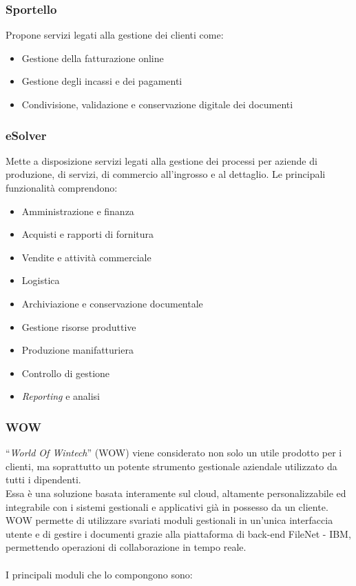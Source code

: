 \subsubsection*{Sportello}
Propone servizi legati alla gestione dei clienti come:  
\begin{itemize}
    \item Gestione della fatturazione online 
    \item Gestione degli incassi e dei pagamenti 
    \item Condivisione, validazione e conservazione digitale dei documenti  
\end{itemize}

\subsubsection*{eSolver}
Mette a disposizione servizi legati alla gestione dei processi per aziende di produzione, di servizi, di commercio all'ingrosso e al dettaglio. 
Le principali funzionalità comprendono: 
\begin{itemize}
    \item Amministrazione e finanza 
    \item Acquisti e rapporti di fornitura 
    \item Vendite e attività commerciale 
    \item Logistica
    \item Archiviazione e conservazione documentale
    \item Gestione risorse produttive 
    \item Produzione manifatturiera  
    \item Controllo di gestione 
    \item \emph{Reporting} e analisi 
\end{itemize}

\subsubsection*{\gls{WOW}}
“\emph{World Of Wintech}” (\gls{WOW}) viene considerato non solo un utile prodotto per i clienti, ma soprattutto un potente strumento gestionale aziendale utilizzato da tutti i dipendenti.\\ 
Essa è una soluzione basata interamente sul \gls{cloud}, altamente personalizzabile ed integrabile con i sistemi gestionali e applicativi già in possesso da un cliente.\\
\gls{WOW} permette di utilizzare svariati moduli gestionali in un'unica interfaccia utente e di gestire i documenti grazie alla piattaforma di \gls{back-end} FileNet - IBM, permettendo operazioni di collaborazione in tempo reale.\\\\
I principali moduli che lo compongono sono: 


